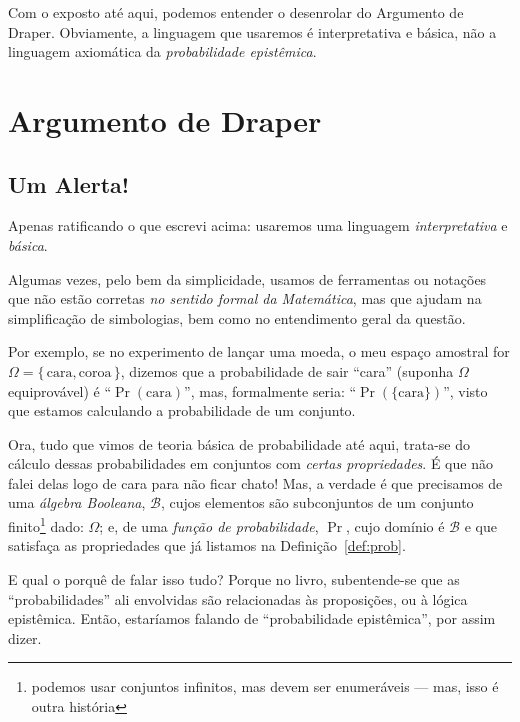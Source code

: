 \documentclass[12pt]{article}
\theoremstyle{definition}
\begin{document}
		Com o exposto até aqui, podemos entender o desenrolar do Argumento de Draper.
		Obviamente, a linguagem que usaremos é interpretativa e básica, não a 
		linguagem axiomática da \textit{probabilidade epistêmica}.

\section{Argumento de Draper}
	\subsection{Um Alerta!}
	 Apenas ratificando o que escrevi acima: usaremos uma linguagem 
		\textit{interpretativa} e \textit{básica}.
		
		Algumas vezes, pelo bem da simplicidade, usamos de ferramentas ou notações
		que não estão	corretas \textit{no sentido formal da Matemática}, mas que 
		ajudam na simplificação de	simbologias, bem como no entendimento geral da 
		questão.
		
		Por exemplo, se no experimento de lançar uma moeda, o meu espaço amostral for
		$ \Omega = \{\,\text{cara}, \text{coroa}\,\} $, dizemos que a probabilidade de 
		sair ``cara'' (suponha $ \Omega $ equiprovável) é ``$\Pr{(\text{cara})}$'', 
		mas, formalmente seria: ``$\Pr{(\{\text{cara}\})}$'', visto que estamos 
		calculando a probabilidade de um conjunto.
		
		Ora, tudo que vimos de teoria básica  de probabilidade até aqui, trata-se do
		cálculo dessas probabilidades em conjuntos com \textit{certas propriedades}.
		É que não falei delas logo de cara para não ficar chato! 
		Mas, a verdade é que precisamos de uma \textit{álgebra Booleana}, 
		$\mathcal{B}$, cujos elementos são subconjuntos de um conjunto 
		finito\footnote{podemos usar conjuntos infinitos, mas devem ser enumeráveis ---
		mas, isso é outra história} dado: $ \Omega $; e, de uma \textit{função de
		probabilidade}, $\Pr$, cujo domínio é $\mathcal{B}$ e que satisfaça as 
		propriedades que já listamos na Definição~\ref{def:prob}. 
		
		E qual o porquê de falar isso tudo?
		Porque no livro, subentende-se que as ``probabilidades'' ali envolvidas são
		relacionadas às proposições, ou à lógica epistêmica.
		Então, estaríamos falando de ``probabilidade epistêmica'', por assim dizer.
		
\end{document}
